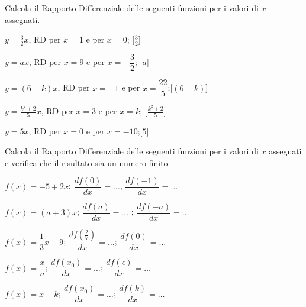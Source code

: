  \begin{esercizio}\label{ese:dif03}
Calcola il Rapporto Differenziale delle seguenti funzioni per i valori di 
\(x\) assegnati.
 \begin{enumeratea}
  \item  \(y=\frac{3}{2}x\), \hspace{5mm}RD per \(x=1\) e per \(x=0\);\hfill 
[\(\frac{3}{2}\)]
  \item  \(y=ax\), \hspace{5mm}RD per \(x=9\) e per \(x=-\dfrac{3}{2}\); \hfill 
[\(a\)]
  \item  \(y=(6-k)x\), \hspace{5mm}RD per \(x=-1\) e per 
\(x=\dfrac{22}{5}\);\hfill [\((6-k)\)]
  \item  \(y=\frac{k^2+2}{5}x\), \hspace{5mm}RD per \(x=3\) e per \(x=k\);\hfill 
[\(\frac{k^2+2}{5}\)]
  \item  \(y=5x\), \hspace{5mm}RD per \(x=0\) e per \(x=-10\);\hfill [\(5\)]
 \end{enumeratea}
\end{esercizio}
 
\begin{esercizio}\label{ese:dif04}
Calcola il Rapporto Differenziale delle seguenti funzioni per i valori di \(x\) 
assegnati e verifica che il risultato sia un numero finito.
 \begin{enumeratea}
  \item  \(f(x) = -5+2x\);\hspace{5mm} \(\dfrac{df(0)}{dx}=\dots\),
  \hspace{5mm}\(\dfrac{df(-1)}{dx}=\dots\)
  \item  \(f(x) = (a+3)x\);\hspace{5mm} \(\dfrac{df(a)}{dx}=\dots\)
  ;\hspace{5mm}   \(\dfrac{df(-a)}{dx}=\dots\)
  \item  \(f(x) = \dfrac{1}{3}x+9\);\hspace{5mm} 
\(\dfrac{df(\frac{2}{7})}{dx}=\dots\);
  \hspace{5mm}   \(\dfrac{df(0)}{dx}=\dots\)
  \item  \(f(x) = \dfrac{x}{n}\);\hspace{5mm} 
\(\dfrac{df(x_0)}{dx}=\dots\);
  \hspace{5mm}   \(\dfrac{df(\epsilon)}{dx}=\dots\)
  \item  \(f(x) = x+k\);\hspace{5mm} \(\dfrac{df(x_0)}{dx}=\dots\);
  \hspace{5mm}   \(\dfrac{df(k)}{dx}=\dots\)
 \end{enumeratea}
\end{esercizio}

